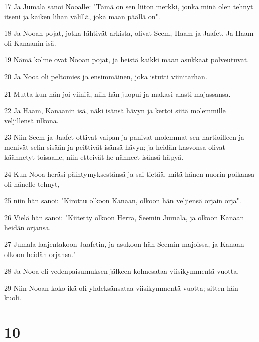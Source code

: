 \par 17 Ja Jumala sanoi Nooalle: "Tämä on sen liiton merkki, jonka minä olen tehnyt itseni ja kaiken lihan välillä, joka maan päällä on".
\par 18 Ja Nooan pojat, jotka lähtivät arkista, olivat Seem, Haam ja Jaafet. Ja Haam oli Kanaanin isä.
\par 19 Nämä kolme ovat Nooan pojat, ja heistä kaikki maan asukkaat polveutuvat.
\par 20 Ja Nooa oli peltomies ja ensimmäinen, joka istutti viinitarhan.
\par 21 Mutta kun hän joi viiniä, niin hän juopui ja makasi alasti majassansa.
\par 22 Ja Haam, Kanaanin isä, näki isänsä hävyn ja kertoi siitä molemmille veljillensä ulkona.
\par 23 Niin Seem ja Jaafet ottivat vaipan ja panivat molemmat sen hartioilleen ja menivät selin sisään ja peittivät isänsä hävyn; ja heidän kasvonsa olivat käännetyt toisaalle, niin etteivät he nähneet isänsä häpyä.
\par 24 Kun Nooa heräsi päihtymyksestänsä ja sai tietää, mitä hänen nuorin poikansa oli hänelle tehnyt,
\par 25 niin hän sanoi: "Kirottu olkoon Kanaan, olkoon hän veljiensä orjain orja".
\par 26 Vielä hän sanoi: "Kiitetty olkoon Herra, Seemin Jumala, ja olkoon Kanaan heidän orjansa.
\par 27 Jumala laajentakoon Jaafetin, ja asukoon hän Seemin majoissa, ja Kanaan olkoon heidän orjansa."
\par 28 Ja Nooa eli vedenpaisumuksen jälkeen kolmesataa viisikymmentä vuotta.
\par 29 Niin Nooan koko ikä oli yhdeksänsataa viisikymmentä vuotta; sitten hän kuoli.

\chapter{10}


